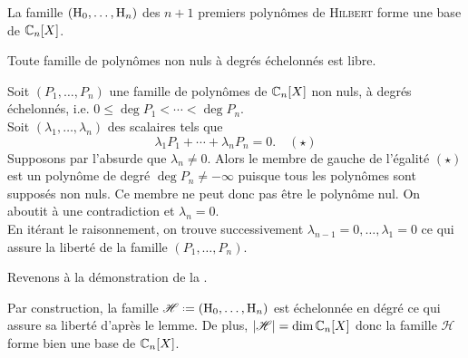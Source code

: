 \begin{prop}{} 
    La famille $(\mathrm{H}_0, \dots, \mathrm{H}_n)$ des $n+1$ premiers polynômes de \textsc{Hilbert} forme une base de $\mathbb{C}_n[X]$.
\end{prop}

\begin{lemme} 
    Toute famille de polynômes non nuls à degrés échelonnés est libre.
\end{lemme}

\begin{preuve}
    Soit $(P_1, \dots, P_n)$ une famille de polynômes de $\mathbb{C}_n[X]$ non nuls, à degrés échelonnés, i.e. $0 \leqslant \deg P_1 < \cdots < \deg P_n$. \\
    Soit $(\lambda_1, \dots, \lambda_n)$ des scalaires tels que
    $$\lambda_1 P_1 + \cdots + \lambda_n P_n = 0. \quad (\star)$$
    Supposons par l'absurde que $\lambda_n \not= 0$. Alors le membre de gauche de l'égalité $(\star)$ est un polynôme de degré $\deg P_n \not= - \infty$ puisque tous les polynômes sont supposés non nuls. Ce membre ne peut donc pas être le polynôme nul. On aboutit à une contradiction et $\lambda_n = 0$. \\ 
    En itérant le raisonnement, on trouve successivement $\lambda_{n-1} = 0, \dots, \lambda_1 = 0$ ce qui assure la liberté de la famille $(P_1, \dots, P_n)$.
\end{preuve}

Revenons à la démonstration de la .

\begin{preuve}
    Par construction, la famille $\mathscr{H} \defeq (\Hilb_0, \dots, \Hilb_n)$ est échelonnée en dégré \note ce qui assure sa liberté d'après le lemme. De plus, $|\mathscr{H}| = \dim \mathbb{C}_n[X]$ donc la famille $\mathscr{H}$ forme bien une base de $\mathbb{C}_n[X]$.
\end{preuve}